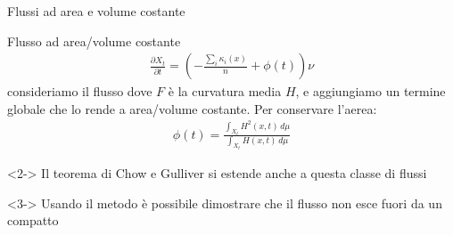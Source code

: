 \begin{frame}{Flussi ad area e volume costante}{}
	\begin{block}{Flusso ad area/volume costante}
		\begin{align*}
			\frac{\partial X_t}{\partial t} = \left(-\frac{\sum_i \kappa_i(x)}{n}+\phi(t)\right) \nu
		\end{align*}
		consideriamo il flusso dove $F$ è la curvatura media $H$, e aggiungiamo un termine globale che lo rende a area/volume costante. Per conservare l'aerea: 
		\begin{align*}
			\phi(t) = \frac{\int_{X_t} H^2(x, t) \, d\mu}{\int_{X_t} H(x, t) \, d\mu}
		\end{align*}
	\end{block}
	\begin{block}{}<2->
		Il teorema di Chow e Gulliver si estende anche a questa classe di flussi
	\end{block}
	\begin{block}{}<3->
		Usando il metodo è possibile dimostrare che il flusso non esce fuori da un compatto
	\end{block}
\end{frame}

